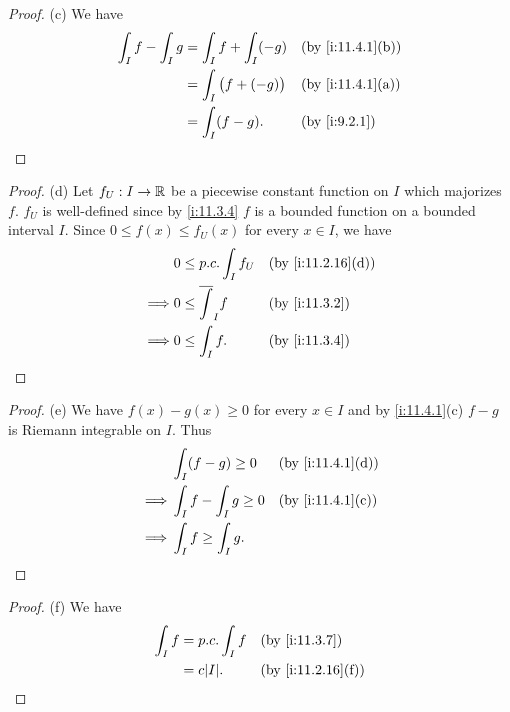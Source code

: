 \begin{proof}{(c)}
  We have
  \begin{align*}
    \int_I f - \int_I g & = \int_I f + \int_I (-g)    &  & \by{i:11.4.1}[b] \\
                        & = \int_I \big(f + (-g)\big) &  & \by{i:11.4.1}[a] \\
                        & = \int_I (f - g).           &  & \by{i:9.2.1}
  \end{align*}
\end{proof}

\begin{proof}{(d)}
  Let \(f_U : I \to \mathbb{R}\) be a piecewise constant function on \(I\) which majorizes \(f\).
  \(f_U\) is well-defined since by \cref{i:11.3.4} \(f\) is a bounded function on a bounded interval \(I\).
  Since \(0 \leq f(x) \leq f_U(x)\) for every \(x \in I\), we have
  \begin{align*}
             & 0 \leq p.c. \int_I f_U     &  & \by{i:11.2.16}[d] \\
    \implies & 0 \leq \overline{\int}_I f &  & \by{i:11.3.2}     \\
    \implies & 0 \leq \int_I f.           &  & \by{i:11.3.4}
  \end{align*}
\end{proof}

\begin{proof}{(e)}
  We have \(f(x) - g(x) \geq 0\) for every \(x \in I\) and by \cref{i:11.4.1}(c) \(f - g\) is Riemann integrable on \(I\).
  Thus
  \begin{align*}
             & \int_I (f - g) \geq 0      &  & \by{i:11.4.1}[d] \\
    \implies & \int_I f - \int_I g \geq 0 &  & \by{i:11.4.1}[c] \\
    \implies & \int_I f \geq \int_I g.
  \end{align*}
\end{proof}

\begin{proof}{(f)}
  We have
  \begin{align*}
    \int_I f & = p.c. \int_I f &  & \by{i:11.3.7}     \\
             & = c \abs{I}.    &  & \by{i:11.2.16}[f]
  \end{align*}
\end{proof}

